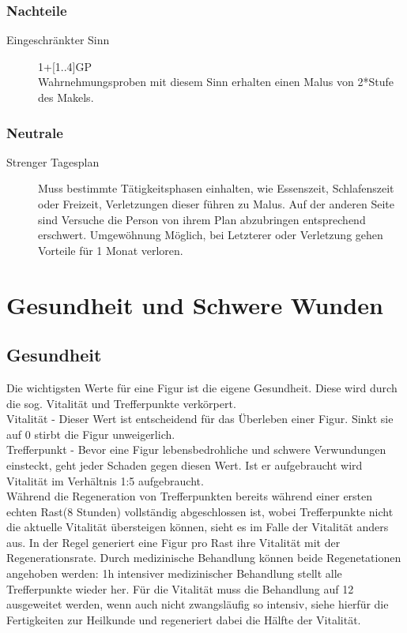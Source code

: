 \documentclass[a4paper,12pt,oneside]{book}
\begin{document}
\subsection{Nachteile}
\begin{description}
\item[Eingeschränkter Sinn]1+[1..4]GP
\\Wahrnehmungsproben mit diesem Sinn erhalten einen Malus von 2*Stufe des Makels.
\end{description}

\subsection{Neutrale}
\begin{description}
\item[Strenger Tagesplan] Muss bestimmte Tätigkeitsphasen einhalten, wie Essenszeit, Schlafenszeit oder Freizeit, Verletzungen dieser führen zu Malus. Auf der anderen Seite sind Versuche die Person von ihrem Plan abzubringen entsprechend erschwert. Umgewöhnung Möglich, bei Letzterer oder Verletzung gehen Vorteile für 1 Monat verloren.
\end{description}    

\chapter{Gesundheit und Schwere Wunden}

\section{Gesundheit}
Die wichtigsten Werte für eine Figur ist die eigene Gesundheit. Diese wird durch die sog. Vitalität und Trefferpunkte verkörpert.
\\Vitalität - Dieser Wert ist entscheidend für das Überleben einer Figur. Sinkt sie auf 0 stirbt die Figur unweigerlich.
\\Trefferpunkt - Bevor eine Figur lebensbedrohliche und schwere Verwundungen einsteckt, geht jeder Schaden gegen diesen Wert. Ist er aufgebraucht wird Vitalität im Verhältnis 1:5 aufgebraucht.
\\Während die Regeneration von Trefferpunkten bereits während einer ersten echten Rast(8 Stunden) vollständig abgeschlossen ist, wobei Trefferpunkte nicht die aktuelle Vitalität übersteigen können, sieht es im Falle der Vitalität anders aus. In der Regel generiert eine Figur pro Rast ihre Vitalität mit der Regenerationsrate. Durch medizinische Behandlung können beide Regenetationen angehoben werden: 1h intensiver medizinischer Behandlung stellt alle Trefferpunkte wieder her. Für die Vitalität muss die Behandlung auf 12 ausgeweitet werden, wenn auch nicht zwangsläufig so intensiv, siehe hierfür die Fertigkeiten zur Heilkunde und regeneriert dabei die Hälfte der Vitalität.
\end{document}
